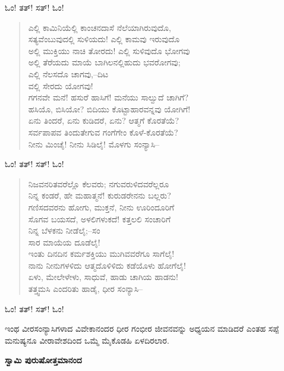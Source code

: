 \begin{flushright}
ಓಂ! ತತ್! ಸತ್! ಓಂ!
\end{flushright}

\begin{verse}
ಎಲ್ಲಿ ಕಾಮಿನಿಯೆಲ್ಲಿ ಕಾಂಚನದಾಸೆ ನೆಲೆಯಾಗಿರುವುದೊ,\\ಸತ್ಯವೆಂಬುವುದಲ್ಲಿ ಸುಳಿಯದು! ಎಲ್ಲಿ ಕಾಮವು ಇರುವುದೊ\\ಅಲ್ಲಿ ಮುಕ್ತಿಯು ನಾಚಿ ತೋರದು! ಎಲ್ಲಿ ಸುಳಿವುದೊ ಭೋಗವು\\ಅಲ್ಲಿ ತೆರೆಯದು ಮಾಯೆ ಬಾಗಿಲನಲ್ಲಿಹುದು ಭವರೋಗವು;\\ಎಲ್ಲಿ ನೆಲಸದೊ ಚಾಗವು,–ದಿಟ\\ವಲ್ಲಿ ಸೇರದು ಯೋಗವು!\\ಗಗನವೇ ಮನೆ! ಹಸುರೆ ಹಾಸಿಗೆ! ಮನೆಯು ಸಾಲ್ವುದೆ ಚಾಗಿಗೆ?\\ಹಸಿಯೊ, ಬಿಸಿಯೋ? ಬಿದಿಯು ಕೊಟ್ಟಾಹಾರವನ್ನವು ಯೋಗಿಗೆ!\\ಏನು ತಿಂದರೆ, ಏನು ಕುಡಿದರೆ, ಏನು? ಆತ್ಮಗೆ ಕೊರತೆಯೆ?\\ಸರ್ವಪಾಪವ ತಿಂದುತೇಗುವ ಗಂಗೆಗೇಂ ಕೊಳೆ-ಕೊರತೆಯೆ?\\ನೀನು ಮಿಂಚೈ! ನೀನು ಸಿಡಿಲೈ! ಮೊಳಗು ಸಂನ್ಯಾಸಿ–
\end{verse}

\begin{flushright}
ಓಂ! ತತ್! ಸತ್! ಓಂ!
\end{flushright}

\begin{verse}
ನಿಜವನರಿತವರೆಲ್ಲೊ ಕೆಲವರು; ನಗುವರುಳಿದವರೆಲ್ಲರೂ\\ನಿನ್ನ ಕಂಡರೆ, ಹೇ ಮಹಾತ್ಮನೆ! ಕುರುಡರೇನನು ಬಲ್ಲರು?\\ಗಣಿಸದವರನು ಹೋಗು, ಮುಕ್ತನೆ, ನೀನು ಊರಿಂದೂರಿಗೆ\\ಸೊಗವ ಬಯಸದೆ, ಅಳಲಿಗಳುಕದೆ! ಕತ್ತಲಲಿ ಸಂಚಾರಿಗೆ\\ನಿನ್ನ ಬೆಳಕನು ನೀಡೆಲೈ;–ಸಂ\\ಸಾರ ಮಾಯೆಯ ದೂಡೆಲೈ!\\ಇಂತು ದಿನದಿನ ಕರ್ಮಶಕ್ತಿಯು ಮುಗಿವವರೆಗೂ ಸಾಗೆಲೈ!\\ನಾನು ನೀನುಗಳಳಿದು ಆತ್ಮದೊಳಿಳಿದು ಕಡೆಯೊಳು ಹೋಗೆಲೈ!\\ಏಳು, ಮೇಲೇಳೇಳು, ಸಾಧುವೆ, ಹಾಡು ಚಾಗಿಯ ಹಾಡನು!\\ತತ್ತ್ವಮಸಿ ಎಂದರಿತು ಹಾಡೈ, ಧೀರ ಸಂನ್ಯಾಸಿ–
\end{verse}

\begin{flushright}
ಓಂ! ತತ್! ಸತ್! ಓಂ!
\end{flushright}

ಇಂಥ ವೀರಸಂನ್ಯಾಸಿಗಳಾದ ವಿವೇಕಾನಂದರ ಧೀರ ಗಂಭೀರ ಜೀವನವನ್ನು ಅಧ್ಯಯನ ಮಾಡಿದರೆ ಎಂತಹ ಸಪ್ಪೆ ಮನುಷ್ಯನೂ ವೀರಾವೇಶದಿಂದ ಒಮ್ಮೆ ಮೈಕೊಡಹಿ ಏಳದಿರಲಾರ.

\begin{flushright}
\textbf{ಸ್ವಾಮಿ ಪುರುಷೋತ್ತಮಾನಂದ}
\end{flushright}

